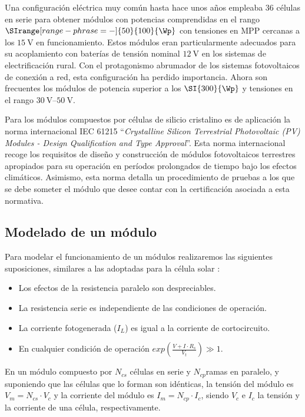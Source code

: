 Una configuración eléctrica muy común hasta hace unos años empleaba
36 células en serie para obtener módulos con potencias comprendidas
en el rango $\SIrange[range-phrase=-]{50}{100}{\Wp}$ con tensiones
en MPP cercanas a los $\SI{15}{\volt}$ en funcionamiento. Estos módulos
eran particularmente adecuados para su acoplamiento con baterías de
tensión nominal $\SI{12}{\volt}$ en los sistemas de electrificación
rural. Con el protagonismo abrumador de los sistemas fotovoltaicos
de conexión a red, esta configuración ha perdido importancia. Ahora
son frecuentes los módulos de potencia superior a los $\SI{300}{\Wp}$
y tensiones en el rango $\SIrange[range-phrase=-]{30}{50}{\volt}$.

Para los módulos compuestos por células de silicio cristalino es de
aplicación la norma internacional IEC 61215 {}``\emph{Crystalline
Silicon Terrestrial Photovoltaic (PV) Modules - Design Qualification
and Type Approval}''. Esta norma internacional recoge los requisitos
de diseño y construcción de módulos fotovoltaicos terrestres apropiados
para su operación en períodos prolongados de tiempo bajo los efectos
climáticos. Asimismo, esta norma detalla un procedimiento de pruebas
a los que se debe someter el módulo que desee contar con la certificación
asociada a esta normativa.


\subsection{Modelado de un módulo}

Para modelar el funcionamiento de un módulos realizaremos las siguientes
suposiciones, similares a las adoptadas para la célula solar \cite{Lorenzo2006c}:
\needspace{4\onelineskip}
\begin{itemize}
\item Los efectos de la resistencia paralelo son despreciables.
\item La resistencia serie es independiente de las condiciones de operación.
\item La corriente fotogenerada ($I_{L}$) es igual a la corriente de cortocircuito.
\item En cualquier condición de operación $exp(\frac{V+I\cdot R_{s}}{V_{t}})\gg1$.
\end{itemize}
En un módulo compuesto por $N_{cs}$ células en serie y $N_{cp}$ramas
en paralelo, y suponiendo que las células que lo forman son idénticas,
la tensión del módulo es $V_{m}=N_{cs}\cdot V_{c}$
y la corriente del módulo es $I_{m}=N_{cp}\cdot I_{c}$, siendo $V_{c}$
e $I_{c}$
la tensión y la corriente de una célula, respectivamente. 

